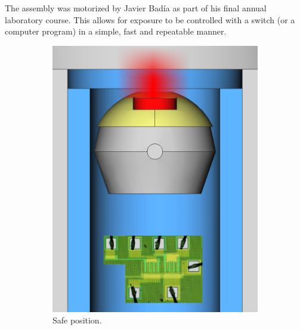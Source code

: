 The assembly was motorized by Javier Badía as part of his final annual laboratory course.
This allows for exposure to be controlled with a switch (or a computer program)
in a simple, fast and repeatable manner.
\begin{figure}[H]
    \centering
    \begin{subfigure}[b]{.45\textwidth}
        \includegraphics{figuras/poster/posicion_no.png}
        \caption{Safe position.}
        \label{fig:posicionno}
    \end{subfigure}
    \hspace{5mm}
    \begin{subfigure}[b]{.45\textwidth}

\end{subfigure}
\end{figure}
